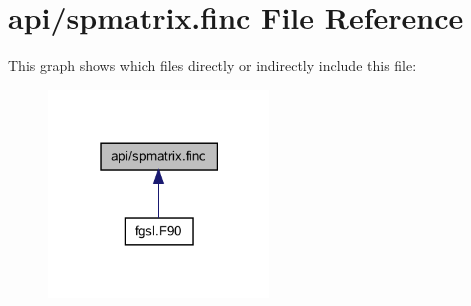\hypertarget{spmatrix_8finc}{}\section{api/spmatrix.finc File Reference}
\label{spmatrix_8finc}
This graph shows which files directly or indirectly include this file\+:\nopagebreak
\begin{figure}[H]
\begin{center}
\leavevmode
\includegraphics[width=166pt]{spmatrix_8finc__dep__incl}
\end{center}
\end{figure}
